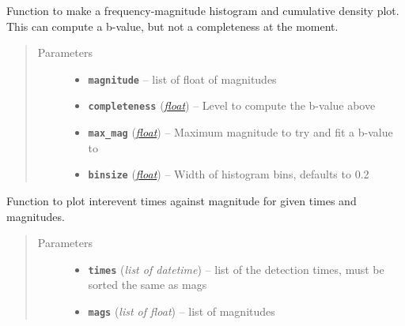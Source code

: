 \documentclass[a4paper,10pt,english]{sphinxmanual}
\begin{document}
\begin{fulllineitems}
\label{submodules/utils.EQcorrscan_plotting:EQcorrscan_plotting.freq_mag}
Function to make a frequency-magnitude histogram and cumulative density
plot.  This can compute a b-value, but not a completeness at the moment.
\begin{quote}\begin{description}
\item[{Parameters}] \leavevmode\begin{itemize}
\item {} 
\textbf{\texttt{magnitude}} -- list of float of magnitudes

\item {} 
\textbf{\texttt{completeness}} (\href{https://docs.python.org/library/functions.html\#float}{\emph{float}}) -- Level to compute the b-value above

\item {} 
\textbf{\texttt{max\_mag}} (\href{https://docs.python.org/library/functions.html\#float}{\emph{float}}) -- Maximum magnitude to try and fit a b-value to

\item {} 
\textbf{\texttt{binsize}} (\href{https://docs.python.org/library/functions.html\#float}{\emph{float}}) -- Width of histogram bins, defaults to 0.2

\end{itemize}

\end{description}\end{quote}

\end{fulllineitems}


\begin{fulllineitems}
\label{submodules/utils.EQcorrscan_plotting:EQcorrscan_plotting.interev_mag}
Function to plot interevent times against magnitude for given times
and magnitudes.
\begin{quote}\begin{description}
\item[{Parameters}] \leavevmode\begin{itemize}
\item {} 
\textbf{\texttt{times}} (\emph{list of datetime}) -- list of the detection times, must be sorted the same as mags

\item {} 
\textbf{\texttt{mags}} (\emph{list of float}) -- list of magnitudes

\end{itemize}

\end{description}\end{quote}

\end{fulllineitems}
\end{document}
